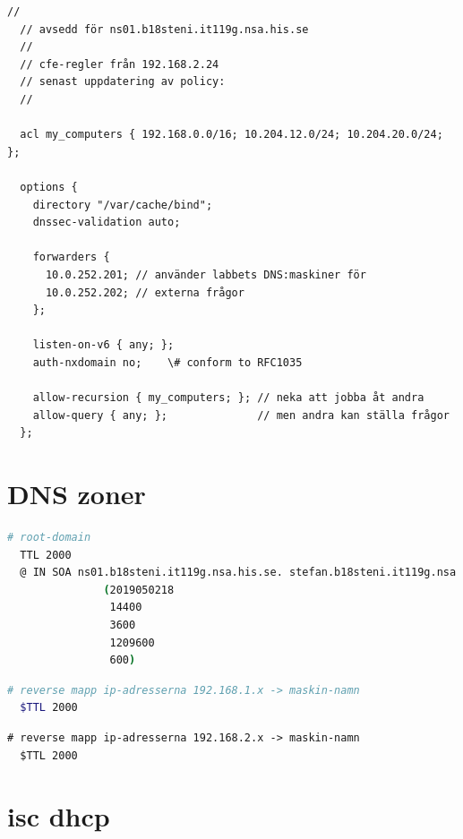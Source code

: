 \documentclass[swedish,10pt,a4paper]{article}
\begin{document}
\begin{lstlisting}[caption={/etc/bind/named.conf.options}]
  //
  // avsedd för ns01.b18steni.it119g.nsa.his.se
  //
  // cfe-regler från 192.168.2.24
  // senast uppdatering av policy:
  //

  acl my_computers { 192.168.0.0/16; 10.204.12.0/24; 10.204.20.0/24; };

  options {
    directory "/var/cache/bind";
    dnssec-validation auto;

    forwarders {
      10.0.252.201; // använder labbets DNS:maskiner för
      10.0.252.202; // externa frågor
    };

    listen-on-v6 { any; };
    auth-nxdomain no;    \# conform to RFC1035

    allow-recursion { my_computers; }; // neka att jobba åt andra
    allow-query { any; };              // men andra kan ställa frågor
  };
\end{lstlisting}

\section{DNS zoner}\label{sec:appendix_dns_zones}

\begin{lstlisting}[language=sh,caption={/etc/bind/zones/db.b18steni.it119g.nsa.his.se}]
  # root-domain
  TTL 2000
  @ IN SOA ns01.b18steni.it119g.nsa.his.se. stefan.b18steni.it119g.nsa.his.se.
               (2019050218
                14400
                3600
                1209600
                600)
\end{lstlisting}

\begin{lstlisting}[language=sh,caption={/etc/bind/zones/db.1.168.192.in-addr.arpa}]
  # reverse mapp ip-adresserna 192.168.1.x -> maskin-namn
  $TTL 2000
\end{lstlisting}

\begin{lstlisting}[caption={/etc/bind/zones/db.2.168.192.in-addr.arpa}]
  # reverse mapp ip-adresserna 192.168.2.x -> maskin-namn
  $TTL 2000
\end{lstlisting}


\section{isc dhcp}\label{sec:appendix_isc_dhcpd_config}
\end{document}

